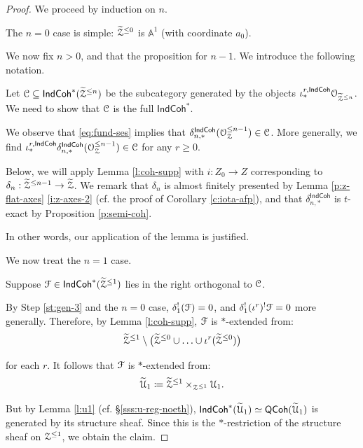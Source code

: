 \documentclass[reqno,11pt]{amsart}
\numberwithin{equation}{subsection}
\theoremstyle{remark}
\newcommand{\bA}{{\mathbb A}}
\newcommand{\sC}{{\EuScript C}}
\newcommand{\sF}{{\EuScript F}}
\newcommand{\sO}{{\EuScript O}}
\newcommand{\sU}{{\EuScript U}}
\newcommand{\sZ}{{\EuScript Z}}
\newcommand{\IndCoh}{\mathsf{IndCoh}}
\newcommand{\QCoh}{\mathsf{QCoh}}
\renewcommand{\subset}{\subseteq}
\begin{document}
\begin{proof}

We proceed by induction on $n$. 

\step 

The $n = 0$ case is simple: $\widetilde{\sZ}^{\leq 0}$ is $\bA^1$ (with coordinate
$a_0$). 

\step 

We now fix $n > 0$, and that the proposition for $n - 1$. 
We introduce the following notation.   

Let $\sC \subset \IndCoh^*(\widetilde{\sZ}^{\leq n})$ be the subcategory generated
by the objects $\iota_*^{r,\IndCoh}\sO_{\widetilde{\sZ}^{\leq n}}$. We need
to show that $\sC$ is the full $\IndCoh^*$.

\step \label{st:gen-3}

We observe that \eqref{eq:fund-ses} implies that 
$\delta_{n,*}^{\IndCoh}(\sO_{\sZ}^{\leq n-1}) \in \sC$. 
More generally, we find 
$\iota_*^{r,\IndCoh}\delta_{n,*}^{\IndCoh}(\sO_{\sZ}^{\leq n-1}) \in \sC$ for
any $r\geq 0$. 

\step 

Below, we will apply Lemma \ref{l:coh-supp} with 
$i:Z_0 \to Z$ corresponding to 
$\delta_n:\widetilde{\sZ}^{\leq n-1} \to \widetilde{\sZ}$. We remark
that $\delta_n$ is almost finitely presented by 
Lemma \ref{p:z-flat-axes} \eqref{i:z-axes-2} 
(cf. the proof of Corollary \ref{c:iota-afp}), and that $\delta_{n,*}^{\IndCoh}$
is $t$-exact by Proposition \ref{p:semi-coh}. 

In other words, our application of the lemma is justified. 

\step 

We now treat the $n = 1$ case. 

Suppose $\sF \in \IndCoh^*(\widetilde{\sZ}^{\leq 1})$ lies in the 
right orthogonal to $\sC$. 

By Step \ref{st:gen-3} and the $n = 0$ case, $\delta_1^!(\sF) = 0$, and 
$\delta_1^!(\iota^r)^! \sF = 0$ more generally. Therefore, 
by Lemma \ref{l:coh-supp}, $\sF$ is $*$-extended from:
%
\[
\widetilde{\sZ}^{\leq 1} \setminus  
\big(\widetilde{\sZ}^{\leq 0} \cup \ldots \cup \iota^r(\widetilde{\sZ}^{\leq 0})\big)
\]

\noindent for each $r$. It follows that $\sF$ is $*$-extended from:
%
\[
\widetilde{\sU}_1 \coloneqq 
\widetilde{\sZ}^{\leq 1} \times_{\sZ^{\leq 1}} \sU_1.
\]

But by Lemma \ref{l:u1} (cf. \S \ref{sss:u-reg-noeth}), 
$\IndCoh^*(\widetilde{\sU}_1) \simeq \QCoh(\widetilde{\sU}_1)$ 
is generated by its structure sheaf. Since this is the $*$-restriction
of the structure sheaf on $\sZ^{\leq 1}$, we obtain the claim. 


\end{proof}
\end{document}

